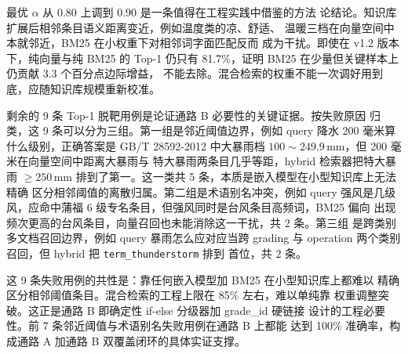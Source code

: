 最优 $\alpha$ 从 0.80 上调到 0.90 是一条值得在工程实践中借鉴的方法
论结论。知识库扩展后相邻条目语义距离变近，例如温度类的凉、舒适、
温暖三档在向量空间中本就邻近，BM25 在小权重下对相邻词字面匹配反而
成为干扰。即使在 v1.2 版本下，纯向量与纯 BM25 的 Top-1 仍只有
81.7\%，证明 BM25 在少量但关键样本上仍贡献 3.3 个百分点边际增益，
不能去除。混合检索的权重不能一次调好用到底，应随知识库规模重新校准。

剩余的 9 条 Top-1 脱靶用例是论证通路 B 必要性的关键证据。按失败原因
归类，这 9 条可以分为三组。第一组是邻近阈值边界，例如 query 降水
200 毫米算什么级别，正确答案是 GB/T 28592-2012 中大暴雨档
$100\sim249.9\,\mathrm{mm}$，但 200 毫米在向量空间中距离大暴雨与
特大暴雨两条目几乎等距，hybrid 检索器把特大暴雨 $\geq 250\,\mathrm{mm}$
排到了第一。这一类共 5 条，本质是嵌入模型在小型知识库上无法精确
区分相邻阈值的离散归属。第二组是术语别名冲突，例如 query 强风是几级
风，应命中蒲福 6 级专名条目，但强风同时是台风条目高频词，BM25 偏向
出现频次更高的台风条目，向量召回也未能消除这一干扰，共 2 条。第三组
是跨类别多文档召回边界，例如 query 暴雨怎么应对应当跨 grading 与
operation 两个类别召回，但 hybrid 把 \texttt{term\_\bk{}thunderstorm} 排到
首位，共 2 条。

这 9 条失败用例的共性是：靠任何嵌入模型加 BM25 在小型知识库上都难以
精确区分相邻阈值条目。混合检索的工程上限在 85\% 左右，难以单纯靠
权重调整突破。这正是通路 B 即确定性 if-else 分级器加 grade\_id 硬链接
设计的工程必要性。前 7 条邻近阈值与术语别名失败用例在通路 B 上都能
达到 100\% 准确率，构成通路 A 加通路 B 双覆盖闭环的具体实证支撑。
